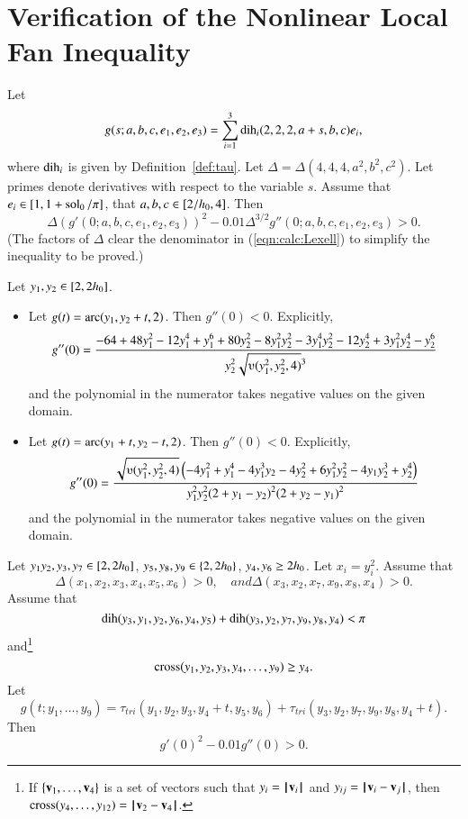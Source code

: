 \chapter{Verification of the Nonlinear Local Fan Inequality}

\begin{calculation}\cutrate{}\label{calc:Lexell}
Let
\[ 
g(s;a,b,c,e_1,e_2,e_3) = \sum_{i=1}^3 \operatorname{dih}_i(2,2,2,a+s,b,c) e_i,
\] 
where $\operatorname{dih}_i$ is given by Definition~\ref{def:tau}.
Let $\Delta = \Delta(4,4,4,a^2,b^2,c^2)$.
Let primes denote derivatives with respect to the variable $s$.
Assume that
$e_i\in[1,1+\operatorname{sol}_0/\pi]$,  that
$a,b,c\in[2/{h_0},4]$.
Then
\begin{equation}\label{eqn:calc:Lexell}
  \Delta (g'(0;a,b,c,e_1,e_2,e_3))^2 
- 0.01\Delta^{3/2}g''(0;a,b,c,e_1,e_2,e_3) > 0.
\end{equation}
(The factors of $\Delta$ clear the denominator in
(\ref{eqn:calc:Lexell}) to simplify the inequality to be proved.)
\end{calculation}

\begin{calculation}\cutrate{}\label{calc:2der}
Let $y_1,y_2\in [ 2,2{h_0}]$.  
\begin{itemize}\wasitemize 
\item 
Let $g(t) = \operatorname{arc}(y_1,y_2+t,2)$.  Then $g''(0) < 0$.
Explicitly,
\[ 
  g''(0) = \dfrac{
    -64 + 48y_1^2 - 12 y_1^4 + y_1^6 
  + 80 y_2^2 - 8 y_1^2 y_2^2 - 3 y_1^4 y_2^2
    - 12 y_2 ^4 + 3 y_1^2 y_2^4 - y_2^6
  }{y_2^2 \sqrt{\ups(y_1^2,y_2^2,4)}^3}
\] 
and the polynomial in the numerator takes negative values on the given
domain.
\item
Let $g(t) = \operatorname{arc}(y_1+t,y_2-t,2)$.  Then $g''(0) < 0$.
Explicitly,
\[ 
  g''(0) = \dfrac{\sqrt{\ups(y_1^2,y_2^2,4)} \left(
      -4 y_1^2 + y_1^4 - 4y_1^3 y_2 - 4y_2^2 
   + 6 y_1^2 y_2^2 - 4 y_1 y_2^3 +y_2^4
    \right)}{y_1^2 y_2^2 (2+y_1-y_2)^2 (2+y_2-y_1)^2}
\] 
and the polynomial in the numerator takes negative values on the given
domain.
\end{itemize}\wasitemize 
\end{calculation}

\begin{calculation}\cutrate{}\label{calc:cc:qua}  %
Let $y_1y_2,y_3,y_7\in [ 2,2{h_0}]$,
$y_5,y_8,y_9\in \{2,2{h_0}\}$, $y_4,y_6\ge 2{h_0}$.
Let $x_i = y_i^2$.
Assume that
\[ 
\Delta(x_1,x_2,x_3,x_4,x_5,x_6)>0,\quad{ and }
\Delta(x_3,x_2,x_7,x_9,x_8,x_4)>0.
\] 
Assume that
\[ 
\operatorname{dih}(y_3,y_1,y_2,y_6,y_4,y_5)+\operatorname{dih}(y_3,y_2,y_7,y_9,y_8,y_4) < \pi
\] 
and\footnote{If $\{{\mathbf v}_1,\ldots,{\mathbf v}_4\}$ is a set of vectors such that
$y_i = {{\hskip0.1em|\hskip-0.15em|\hskip0.1em}{\mathbf v}_i{\hskip0.1em|\hskip-0.15em|\hskip0.1em}}$ and $y_{ij} = \norm{\v_i}{\v_j}$, then
$\op{cross}(y_4,\ldots,y_{12}) = \norm{\v_2}{\v_4}$.}
\[ 
{\operatorname{cross}}(y_1,y_2,y_3,y_4,\ldots,y_9) \ge y_4.
\] 
Let 
\[ g(t;y_1,\ldots,y_9) =
  \tau_{tri}(y_1,y_2,y_3,y_4+t,y_5,y_6)+\tau_{tri}(y_3,y_2,y_7,y_9,y_8,y_4+t).
\] 
Then \[ g'(0)^2 - 0.01 g''(0) > 0.\] 
\end{calculation}


